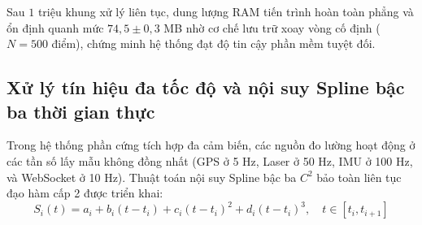\begin{table}[H]
\centering
\caption{Theo dõi các chỉ số tài nguyên phần mềm và độ trễ qua các mốc chu kỳ kiểm thử tải dài hạn}
\label{tab:software-stress-1m-frames}
\end{table}

Sau $1$ triệu khung xử lý liên tục, dung lượng RAM tiến trình hoàn toàn phẳng và ổn định quanh mức $74{,}5 \pm 0{,}3$ MB nhờ cơ chế lưu trữ xoay vòng cố định ($N=500$ điểm), chứng minh hệ thống đạt độ tin cậy phần mềm tuyệt đối.

\subsection{Xử lý tín hiệu đa tốc độ và nội suy Spline bậc ba thời gian thực}

\hspace{0.5cm} Trong hệ thống phần cứng tích hợp đa cảm biến, các nguồn đo lường hoạt động ở các tần số lấy mẫu không đồng nhất (GPS ở 5 Hz, Laser ở 50 Hz, IMU ở 100 Hz, và WebSocket ở 10 Hz). Thuật toán nội suy Spline bậc ba $C^2$ bảo toàn liên tục đạo hàm cấp 2 được triển khai:
\begin{equation}
S_i(t) = a_i + b_i (t - t_i) + c_i (t - t_i)^2 + d_i (t - t_i)^3, \quad t \in [t_i, t_{i+1}]
\label{eq:cubic-spline-interpolation}
\end{equation}

